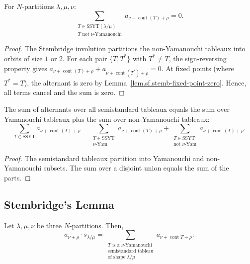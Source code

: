 \begin{lemma}
\label{lem.sf.non-yamanouchi-cancel}
\leanhelper
\leanok
For $N$-partitions $\lambda, \mu, \nu$:
\[
  \sum_{\substack{T \in \mathrm{SSYT}(\lambda/\mu) \\ T \text{ not } \nu\text{-Yamanouchi}}}
  a_{\nu + \operatorname{cont}(T) + \rho} = 0.
\]
\end{lemma}

\begin{proof}
\leanok
The Stembridge involution partitions the non-Yamanouchi tableaux into orbits
of size $1$ or $2$. For each pair $\{T, T^*\}$ with $T^* \neq T$, the sign-reversing
property gives $a_{\nu + \operatorname{cont}(T) + \rho} + a_{\nu + \operatorname{cont}(T^*) + \rho} = 0$.
At fixed points (where $T^* = T$), the alternant is zero by
Lemma~\ref{lem.sf.stemb-fixed-point-zero}. Hence, all terms cancel and the sum is zero.
\end{proof}

\begin{lemma}
\label{lem.sf.alternant-sum-split}
\leanhelper
\leanok
The sum of alternants over all semistandard tableaux equals the sum over
Yamanouchi tableaux plus the sum over non-Yamanouchi tableaux:
\[
  \sum_{T \in \mathrm{SSYT}} a_{\nu + \operatorname{cont}(T) + \rho}
  = \sum_{\substack{T \in \mathrm{SSYT} \\ \nu\text{-Yam}}} a_{\nu + \operatorname{cont}(T) + \rho}
  + \sum_{\substack{T \in \mathrm{SSYT} \\ \text{not } \nu\text{-Yam}}} a_{\nu + \operatorname{cont}(T) + \rho}.
\]
\end{lemma}

\begin{proof}
\leanok
The semistandard tableaux partition into Yamanouchi and non-Yamanouchi subsets.
The sum over a disjoint union equals the sum of the parts.
\end{proof}

\subsection{Stembridge's Lemma}

\begin{lemma}
\label{lem.sf.stemb-lem}
\leantarget
\leanok
Let $\lambda,\mu,\nu$ be three
$N$-partitions. Then,%
\[
a_{\nu+\rho}\cdot s_{\lambda/\mu}=\sum_{\substack{T\text{ is a }%
\nu\text{-Yamanouchi}\\\text{semistandard tableau}\\\text{of shape }%
\lambda/\mu}}a_{\nu+\operatorname*{cont}T+\rho}.
\]
\end{lemma}

